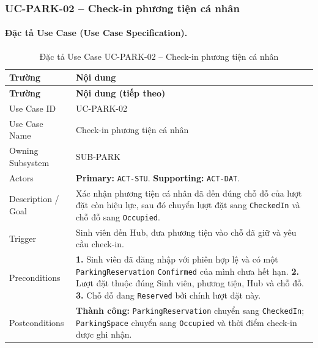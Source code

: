 \normalsize

\clearpage
\subsubsection{UC-PARK-02 -- Check-in phương tiện cá nhân}


\paragraph{Đặc tả Use Case (Use Case Specification).}
\small
\begin{longtable}{|L{42mm}|L{102mm}|}
  \caption{Đặc tả Use Case UC-PARK-02 -- Check-in phương tiện cá nhân}\label{tab:spec-UC-PARK-02}\\
  \hline
  \centering\arraybackslash\textbf{Trường} & \centering\arraybackslash\textbf{Nội dung}\\
  \hline
  \endfirsthead
  \hline
  \centering\arraybackslash\textbf{Trường} & \centering\arraybackslash\textbf{Nội dung (tiếp theo)}\\
  \hline
  \endhead
  Use Case ID & UC-PARK-02\\\hline
  Use Case Name & Check-in phương tiện cá nhân\\\hline
  Owning Subsystem & SUB-PARK\\\hline
  Actors & \textbf{Primary:} \texttt{ACT-STU}. \textbf{Supporting:} \texttt{ACT-DAT}.\\\hline
  Description / Goal & Xác nhận phương tiện cá nhân đã đến đúng chỗ đỗ của lượt đặt còn hiệu lực, sau đó chuyển lượt đặt sang \texttt{CheckedIn} và chỗ đỗ sang \texttt{Occupied}.\\\hline
  Trigger & Sinh viên đến Hub, đưa phương tiện vào chỗ đã giữ và yêu cầu check-in.\\\hline
  Preconditions &
    \textbf{1.} Sinh viên đã đăng nhập với phiên hợp lệ và có một \texttt{ParkingReservation} \texttt{Confirmed} của mình chưa hết hạn.\newline
    \textbf{2.} Lượt đặt thuộc đúng Sinh viên, phương tiện, Hub và chỗ đỗ.\newline
    \textbf{3.} Chỗ đỗ đang \texttt{Reserved} bởi chính lượt đặt này.\\\hline
  Postconditions &
    \textbf{Thành công:} \texttt{ParkingReservation} chuyển sang \texttt{CheckedIn}; \texttt{ParkingSpace} chuyển sang \texttt{Occupied} và thời điểm check-in được ghi nhận.\newline

\end{longtable}
